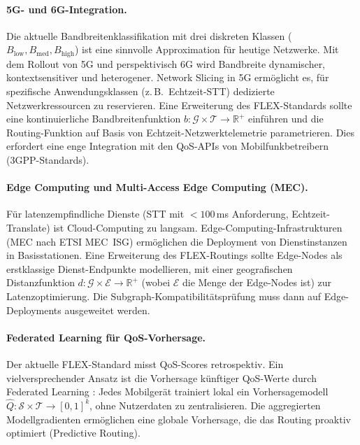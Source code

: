 ﻿\documentclass[a4paper,12pt]{article}
\theoremstyle{definition}
\begin{document}
\paragraph{5G- und 6G-Integration.}
Die aktuelle Bandbreitenklassifikation mit drei diskreten Klassen ($B_\mathrm{low}, B_\mathrm{med}, B_\mathrm{high}$) ist eine sinnvolle Approximation für heutige Netzwerke. Mit dem Rollout von 5G und perspektivisch 6G wird Bandbreite dynamischer, kontextsensitiver und heterogener. Network Slicing in 5G ermöglicht es, für spezifische Anwendungsklassen (z.\,B.\ Echtzeit-STT) dedizierte Netzwerkressourcen zu reservieren. Eine Erweiterung des FLEX-Standards sollte eine kontinuierliche Bandbreitenfunktion $b: \mathcal{G} \times \mathcal{T} \to \mathbb{R}^+$ einführen und die Routing-Funktion auf Basis von Echtzeit-Netzwerktelemetrie parametrieren. Dies erfordert eine enge Integration mit den QoS-APIs von Mobilfunkbetreibern (3GPP-Standards).

\paragraph{Edge Computing und Multi-Access Edge Computing (MEC).}
Für latenzempfindliche Dienste (STT mit $< 100$\,ms Anforderung, Echtzeit-Translate) ist Cloud-Computing zu langsam. Edge-Computing-Infrastrukturen (MEC nach ETSI MEC~ISG) ermöglichen die Deployment von Dienstinstanzen in Basisstationen. Eine Erweiterung des FLEX-Routings sollte Edge-Nodes als erstklassige Dienst-Endpunkte modellieren, mit einer geografischen Distanzfunktion $d: \mathcal{G} \times \mathcal{E} \to \mathbb{R}^+$ (wobei $\mathcal{E}$ die Menge der Edge-Nodes ist) zur Latenzoptimierung. Die Subgraph-Kompatibilitätsprüfung muss dann auf Edge-Deployments ausgeweitet werden.

\paragraph{Federated Learning für QoS-Vorhersage.}
Der aktuelle FLEX-Standard misst QoS-Scores retrospektiv. Ein vielversprechender Ansatz ist die Vorhersage künftiger QoS-Werte durch Federated Learning \cite{mcmahan2017}: Jedes Mobilgerät trainiert lokal ein Vorhersagemodell $\hat{Q}: \mathcal{S} \times \mathcal{T} \to [0,1]^k$, ohne Nutzerdaten zu zentralisieren. Die aggregierten Modellgradienten ermöglichen eine globale Vorhersage, die das Routing proaktiv optimiert (Predictive Routing).
\end{document}
